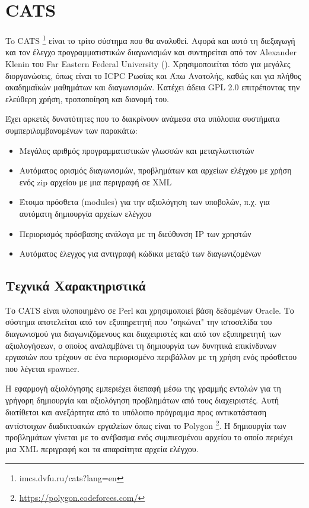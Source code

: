 \documentclass[diploma]{softlab-thesis}
\begin{document}
\FloatBarrier

\section{CATS}

To CATS \footnote{imcs.dvfu.ru/cats?lang=en} είναι το τρίτο σύστημα που θα
αναλυθεί. Αφορά και αυτό τη διεξαγωγή και τον έλεγχο προγραμματιστικών
διαγωνισμών και συντηρείται από τον Alexander Klenin του Far Eastern Federal
University (\cite{Rozhkov}). Χρησιμοποιείται τόσο για μεγάλες διοργανώσεις,
όπως είναι το ICPC Ρωσίας και Άπω Ανατολής, καθώς και για πλήθος ακαδημαϊκών
μαθημάτων και διαγωνισμών. Κατέχει άδεια GPL 2.0 επιτρέποντας την ελεύθερη
χρήση, τροποποίηση και διανομή του.

\bigskip

Έχει αρκετές δυνατότητες που το διακρίνουν ανάμεσα στα υπόλοιπα συστήματα
συμπεριλαμβανομένων των παρακάτω:

\begin{itemize}
    \item Μεγάλος αριθμός προγραμματιστικών γλωσσών και μεταγλωττιστών
    \item Αυτόματος ορισμός διαγωνισμών, προβλημάτων και αρχείων ελέγχου με χρήση
      ενός zip αρχείου με μια περιγραφή σε XML
    \item Έτοιμα πρόσθετα (modules) για την αξιολόγηση των υποβολών, π.χ. για
      αυτόματη δημιουργία αρχείων ελέγχου
    \item Περιορισμός πρόσβασης ανάλογα με τη διεύθυνση IP των χρηστών
    \item Αυτόματος έλεγχος για αντιγραφή κώδικα μεταξύ των διαγωνιζομένων
\end{itemize}

\subsection{Τεχνικά Χαρακτηριστικά}

Το CATS είναι υλοποιημένο σε Perl και χρησιμοποιεί βάση δεδομένων Oracle. Το
σύστημα αποτελείται από τον εξυπηρετητή που "σηκώνει" την ιστοσελίδα του
διαγωνισμού για διαγωνιζόμενους και διαχειριστές και από τον εξυπηρετητή των
αξιολογήσεων, ο οποίος αναλαμβάνει τη δημιουργία των δυνητικά επικίνδυνων
εργασιών που τρέχουν σε ένα περιορισμένο περιβάλλον με τη χρήση ενός πρόσθετου
που λέγεται spawner.

\bigskip

Η εφαρμογή αξιολόγησης εμπεριέχει διεπαφή μέσω της γραμμής εντολών για τη
γρήγορη δημιουργία και αξιολόγηση προβλημάτων από τους διαχειριστές. Αυτή
διατίθεται και ανεξάρτητα από το υπόλοιπο πρόγραμμα προς αντικατάσταση
αντίστοιχων διαδικτυακών εργαλείων όπως είναι το Polygon
\footnote{\url{https://polygon.codeforces.com/}}. Η δημιουργία των προβλημάτων
γίνεται με το ανέβασμα ενός συμπιεσμένου αρχείου το οποίο περιέχει μια XML
περιγραφή και τα απαραίτητα αρχεία ελέγχου.
\end{document}
